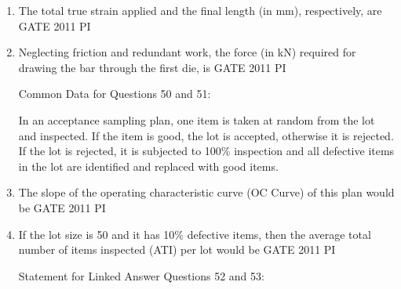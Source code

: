 \documentclass[journal,12pt,onecolumn]{IEEEtran}
\theoremstyle{remark}
\begin{document}
\begin{enumerate}
\item The total true strain applied and the final length (in mm), respectively, are
\hfill{GATE 2011 PI}
\begin{enumerate}
\end{enumerate}

\item Neglecting friction and redundant work, the force (in kN) required for drawing the bar through the first die, is
\hfill{GATE 2011 PI}
\begin{enumerate}
\end{enumerate}

Common Data for Questions 50 and 51:

In an acceptance sampling plan, one item is taken at random from the lot and inspected. If the item is good, the lot is accepted, otherwise it is rejected. If the lot is rejected, it is subjected to 100\% inspection and all defective items in the lot are identified and replaced with good items.

\item The slope of the operating characteristic curve (OC Curve) of this plan would be
\hfill{GATE 2011 PI}
\begin{enumerate}
\end{enumerate}

\item If the lot size is 50 and it has 10\% defective items, then the average total number of items inspected (ATI) per lot would be
\hfill{GATE 2011 PI}
\begin{enumerate}
\end{enumerate}
Statement for Linked Answer Questions 52 and 53:


\end{enumerate}
\end{document}

